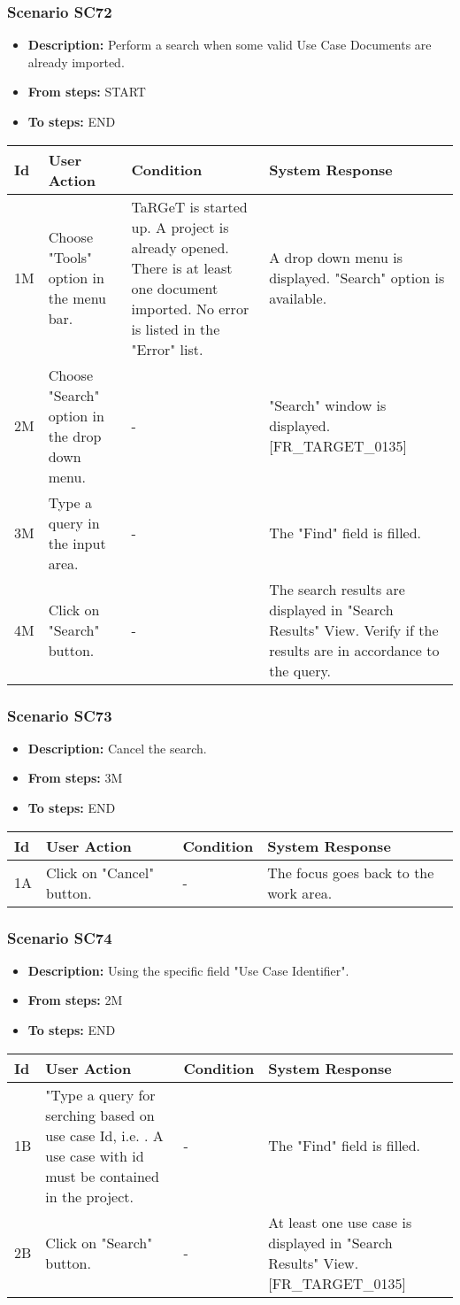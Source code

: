 \documentclass[a4paper,11pt]{article}
\newcommand{\bl}{\\ \hline}
\begin{document}
\subsubsection*{Scenario SC72}
\begin{itemize}
\item {\bf Description:} Perform a search when some valid Use Case Documents are
					already imported.
\item {\bf From steps:} START
\item {\bf To steps:} END
\end{itemize}
\begin{tabular}{|p{0.4in}|p{1.5in}|p{1.5in}|p{1.5in}|}
\hline
Id & User Action & Condition & System Response \bl 
1M & Choose "Tools" option in the menu bar. & TaRGeT is started up. A project is already opened. There
						is at least one document imported. No error is listed in the
						"Error" list. & A drop down menu is displayed. "Search" option is
						available.\bl
2M & Choose "Search" option in the drop down menu. & - & "Search" window is displayed. [FR_TARGET_0135]\bl
3M & Type a query in the input area. & - & The "Find" field is filled.\bl
4M & Click on "Search" button. & - & The search results are displayed in "Search Results"
						View. Verify if the results are in accordance to the query.
					\bl
\end{tabular}
\subsubsection*{Scenario SC73}
\begin{itemize}
\item {\bf Description:} Cancel the search.
\item {\bf From steps:} 3M
\item {\bf To steps:} END
\end{itemize}
\begin{tabular}{|p{0.4in}|p{1.5in}|p{1.5in}|p{1.5in}|}
\hline
Id & User Action & Condition & System Response \bl 
1A & Click on "Cancel" button.  & - & The focus goes back to the work area.\bl
\end{tabular}
\subsubsection*{Scenario SC74}
\begin{itemize}
\item {\bf Description:} Using the specific field "Use Case Identifier".
				
\item {\bf From steps:} 2M
\item {\bf To steps:} END
\end{itemize}
\begin{tabular}{|p{0.4in}|p{1.5in}|p{1.5in}|p{1.5in}|}
\hline
Id & User Action & Condition & System Response \bl 
1B & "Type a query for serching based on use case Id, i.e.
						. A
						use case with id
						must be contained in the project. & - & The "Find" field is filled.\bl
2B & Click on "Search" button. & - & At least one use case is displayed in "Search Results"
						View. [FR_TARGET_0135]\bl
\end{tabular}
\end{document}
